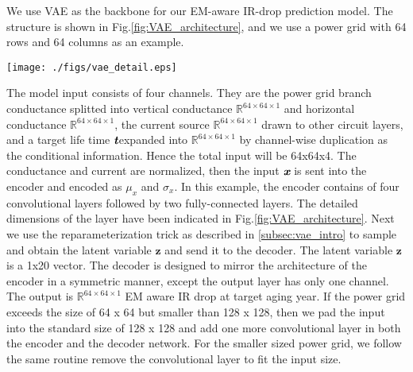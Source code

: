 We use VAE as the backbone for our EM-aware IR-drop prediction model. The structure is shown in Fig.\ref{fig:VAE_architecture}, and we use a power grid with 64 rows and 64 columns as an example.

\begin{figure*}[h!]
	\centering
	\texttt{[image: ./figs/vae\_detail.eps]}
	\caption{VAE-based model for EM-aware IR drop prediction} 
	\label{fig:VAE_architecture}
\end{figure*}


The model input consists of four channels. They are the power grid branch conductance splitted into vertical conductance $\mathbb{R} ^{64\times 64\times 1}$ and horizontal conductance $\mathbb{R} ^{64\times 64\times 1}$, the current source $\mathbb{R} ^{64\times 64\times 1}$ drawn to other circuit layers, and a target life time $\textit{\textbf{t}} $expanded into $\mathbb{R} ^{64\times 64\times 1}$ by channel-wise duplication as the conditional information. Hence the total input will be 64x64x4. 
The conductance and current are normalized, then the input $\textit{\textbf{x}}$ is sent into the encoder and encoded as $ \mu_{x} $  and $ \sigma_{x}$. 
In this example, the encoder contains of four convolutional layers followed by two fully-connected layers. The detailed dimensions of the layer have been indicated in Fig.\ref{fig:VAE_architecture}. 
Next we use the reparameterization trick as described in \ref{subsec:vae_intro}  to sample and obtain the latent variable $\textbf{z}$ and send it to the decoder. The latent variable $\textbf{z}$ is a 1x20 vector.
The decoder is designed to mirror the architecture of the encoder in a symmetric manner, except the output layer has only one channel. The output is $\mathbb{R} ^{64\times 64\times 1}$ EM aware IR drop at target aging year.
If the power grid exceeds the size of 64 x 64 but smaller than 128 x 128, then we pad the input into the standard size of 128 x 128 and add one more convolutional layer in both the encoder and the decoder network. 
For the smaller sized power grid, we follow the same routine remove the convolutional layer to fit the input size.

